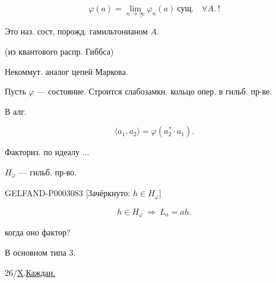 \begin{equation*}\underline{\varphi(a)=\lim_{n\to\infty}\varphi_n(a)\ \text{сущ.}}\quad\forall A.\ !\end{equation*}





Это наз. сост, порожд. гамильтонианом $A$.

(из квантового распр. Гиббса)

Некоммут. аналог цепей Маркова.

Пусть $\varphi$ --- состояние. Строится слабозамкн. кольцо опер. в гильб. пр-ве.

В алг.

\begin{equation*}\langle a_1,a_2\rangle=\varphi(a_2^*\cdot a_1).\end{equation*}

Факториз. по идеалу $\ldots$

$H_\varphi$ --- гильб. пр-во.

\begin{GelfandAdjacentEvidence}{GELFAND-P000308}{3}
[Зачёркнуто: $h\in H_\varphi$]

\end{GelfandAdjacentEvidence}


\begin{equation*}h\in H_\varphi\ \Longrightarrow\ L_a=ah.\end{equation*}






когда оно фактор?

В основном типа 3.



26/\underline{X}.\qquad\underline{\underline{Каждан.}}

\hfill{}

